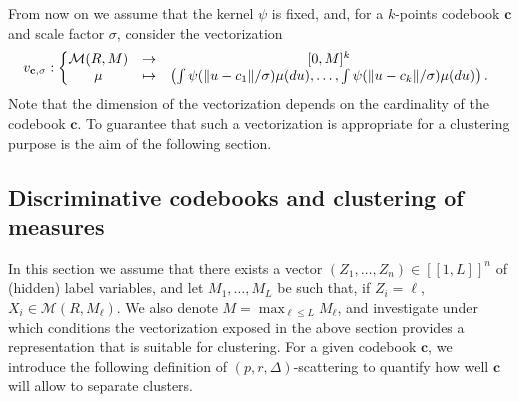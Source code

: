 \documentclass[noinfoline,preprint]{article}
\newcommand{\cb}{\mathbf{c}}
\renewcommand{\1}{\mathds 1}
\begin{document}
From now on we assume that the kernel $\psi$ is fixed, and, for a $k$-points codebook $\cb$ and scale factor $\sigma$, consider the vectorization
\begin{align}\label{eq:vectorization}
v_{\cb,\sigma}: \left \{ \begin{array}{@{}ccc}
\mathcal{M}(R,M) & \rightarrow & [0,M]^k \\
\mu & \mapsto & \left ( \int \psi(\|u-c_1\|/\sigma) \mu(du), \hdots, \int \psi(\|u-c_k\|/\sigma) \mu(du) \right ).
\end{array}
\right .
\end{align}
Note that the dimension of the vectorization depends on the cardinality of the codebook $\cb$. To guarantee that such a vectorization is appropriate for a clustering purpose is the aim of the following section. 

\subsection{Discriminative codebooks and clustering of measures}\label{sec:measures_clustering}

In this section we assume that there exists a vector $(Z_1, \hdots, Z_n) \in [\![1,L]\!]^n$ of (hidden) label variables, and let $M_1, \hdots, M_L$ be such that, if $Z_i = \ell$, $X_i \in \mathcal{M}(R,M_\ell)$. We also denote $M = \max_{\ell \leq L} M_\ell$, and investigate under which conditions the vectorization exposed in the above section provides a representation that is suitable for clustering.    For a given codebook $\cb$, we introduce the following definition of $(p,r,\Delta)$-scattering to quantify how well $\cb$ will allow to separate clusters.
\end{document}
